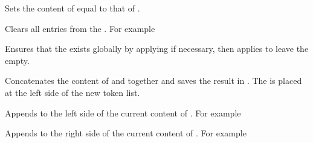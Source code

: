 \documentclass[oneside]{book}
\begin{document}
\begin{function}{\TlSetEq}
\begin{syntax}
  
\end{syntax}
Sets the content of  equal to that of
.
\end{function}

\begin{function}{\TlClear}
\begin{syntax}
 
\end{syntax}
Clears all entries from the . For example
\begin{demohigh}
\TlSet {}
\TlClear \lTmpjTl
\TlSet {}
\TlUse \lTmpjTl
\end{demohigh}
\end{function}

\begin{function}{\TlClearNew}
\begin{syntax}
 
\end{syntax}
Ensures that the  exists globally by applying
 if necessary, then applies  to leave
the  empty.
\end{function}

\begin{function}{\TlConcat}
\begin{syntax}
   
\end{syntax}
Concatenates the content of  and 
together and saves the result in . The 
is placed at the left side of the new token list.
\end{function}

\begin{function}{\TlPutLeft}
\begin{syntax}
  
\end{syntax}
Appends  to the left side of the current content of
. For example
\begin{demohigh}
\TlSet {}
\TlPutLeft {}
\TlUse \lTmpkTl
\end{demohigh}
\end{function}

\begin{function}{\TlPutRight}
\begin{syntax}
  
\end{syntax}
Appends  to the right side of the current content of
. For example
\begin{demohigh}
\TlSet {}
\TlPutRight {}
\TlUse \lTmpkTl
\end{demohigh}
\end{function}
\end{document}
